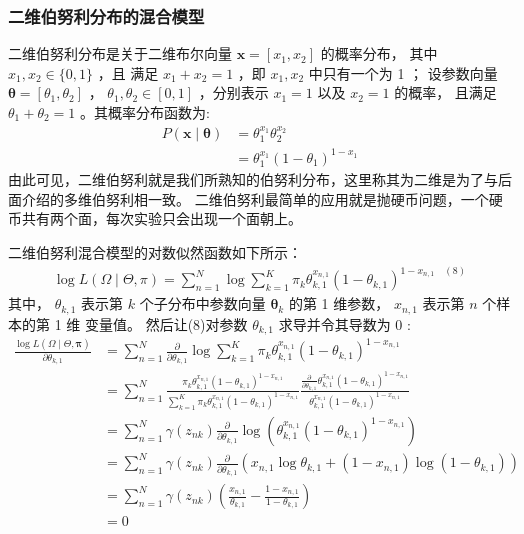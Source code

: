 \documentclass[UTF8]{ctexart}
\numberwithin{equation}{section}
\begin{document}
\subsubsection{二维伯努利分布的混合模型}
二维伯努利分布是关于二维布尔向量 $\boldsymbol{x}=\left[x_{1}, x_{2}\right]$ 的概率分布，
其中 $x_{1}, x_{2} \in\{0,1\}$ ，且 
满足 $x_{1}+x_{2}=1$ ，即 $x_{1}, x_{2}$ 中只有一个为 1 ；
设参数向量 $\boldsymbol{\theta}=\left[\theta_{1}, \theta_{2}\right]$ ，
$\theta_{1}, \theta_{2} \in[0,1]$ ，分别表示 $x_{1}=1$ 以及 $x_{2}=1$ 的概率，
且满足 $\theta_{1}+\theta_{2}=1$ 。其概率分布函数为:
$$
\begin{aligned}
P(\boldsymbol{x} \mid \boldsymbol{\theta}) &=\theta_{1}^{x_{1}} \theta_{2}^{x_{2}} \\
&=\theta_{1}^{x_{1}}\left(1-\theta_{1}\right)^{1-x_{1}}
\end{aligned}
$$
由此可见，二维伯努利就是我们所熟知的伯努利分布，这里称其为二维是为了与后面介绍的多维伯努利相一致。
二维伯努利最简单的应用就是抛硬币问题，一个硬币共有两个面，每次实验只会出现一个面朝上。

二维伯努利混合模型的对数似然函数如下所示：
$$
\begin{aligned}
\log L(\Omega \mid \Theta, \pi)=\sum_{n=1}^{N} \log \sum_{k=1}^{K} \pi_{k} \theta_{k, 1}^{x_{n, 1}}\left(1-\theta_{k, 1}\right)^{1-x_{n, 1} \quad(8)}
\end{aligned}
$$
其中， $\theta_{k, 1}$ 表示第 $k$ 个子分布中参数向量 $\boldsymbol{\theta}_{k}$ 的第 1 维参数， $x_{n, 1}$ 表示第 $n$ 个样本的第 1 维 变量值。
然后让(8)对参数 $\theta_{k, 1}$ 求导并令其导数为 0 :
$$
\begin{aligned}
\frac{\log L(\Omega \mid \Theta, \boldsymbol{\pi})}{\partial \theta_{k, 1}}
&=\sum_{n=1}^{N} \frac{\partial}{\partial \theta_{k, 1}} \log \sum_{k=1}^{K} \pi_{k} \theta_{k, 1}^{x_{n, 1}}\left(1-\theta_{k, 1}\right)^{1-x_{n, 1}}\\
&=\sum_{n=1}^{N} \frac{\pi_{k} \theta_{k, 1}^{x_{n, 1}}\left(1-\theta_{k, 1}\right)^{1-x_{n, 1}}}{\sum_{k=1}^{K} \pi_{k} \theta_{k, 1}^{x_{n, 1}}\left(1-\theta_{k, 1}\right)^{1-x_{n, 1}}} \frac{\frac{\partial}{\partial \theta_{k, 1}} \theta_{k, 1}^{x_{n, 1}}\left(1-\theta_{k, 1}\right)^{1-x_{n, 1}}}{\theta_{k, 1}^{x_{n, 1}}\left(1-\theta_{k, 1}\right)^{1-x_{n, 1}}}\\
&=\sum_{n=1}^{N} \gamma\left(z_{n k}\right) \frac{\partial}{\partial \theta_{k, 1}} \log \left(\theta_{k, 1}^{x_{n, 1}}\left(1-\theta_{k, 1}\right)^{1-x_{n, 1}}\right)\\
&=\sum_{n=1}^{N} \gamma\left(z_{n k}\right) \frac{\partial}{\partial \theta_{k, 1}}\left(x_{n, 1} \log \theta_{k, 1}+\left(1-x_{n, 1}\right) \log \left(1-\theta_{k, 1}\right)\right)\\
&=\sum_{n=1}^{N} \gamma\left(z_{n k}\right)\left(\frac{x_{n, 1}}{\theta_{k, 1}}-\frac{1-x_{n, 1}}{1-\theta_{k, 1}}\right)\\
&=0
\end{aligned}
$$
\end{document}
